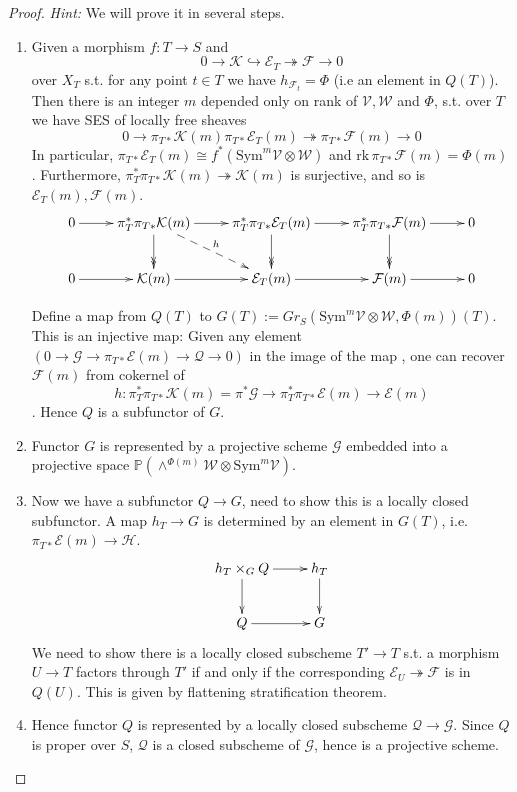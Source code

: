 \documentclass{article}
\begin{document}
\begin{proof}
	\emph{Hint:} We will prove it in several steps. 
	\begin{enumerate}
		\item Given a morphism $ f:T\to S $  and 
		$$ 0\to \mathcal{K}\hookrightarrow\mathcal{E}_T\twoheadrightarrow \mathcal{F}\to 0 $$
		over $ X_T $ s.t. for any point $ t\in T $  we have $ h_{\mathcal{F}_t}=\Phi $ (i.e an element in $ Q(T) $). Then  there is an integer $ m $ depended only on rank of $ \mathcal{V,W} $ and $ \Phi $, s.t. over $ T $ we have SES of locally free sheaves $$ 0\to\pi_{T*}\mathcal{K}(m)\pi_{T*}\mathcal{E}_T(m)\twoheadrightarrow\pi_{T*}\mathcal{F}(m)\to 0 $$
		In particular, $ \pi_{T*}\mathcal{E}_T(m)\cong f^*(\mathrm{Sym}^m\mathcal{V}\otimes \mathcal{W}) $ and $ \mathrm{rk}\,\pi_{T*}\mathcal{F}(m)=\Phi(m) $. Furthermore, $ \pi^*_T\pi_{T*}\mathcal{K}(m)\twoheadrightarrow \mathcal{K}(m) $ is surjective, and so is $ \mathcal{E}_T(m), \mathcal{F}(m) $. 
		$$ \xymatrix{
		0\ar[r]&\pi^*_T\pi_{T*}\mathcal{K}(m)\ar[r]\ar@{->>}[d]\ar@{-->}[dr]^h&\pi^*_T\pi_{T*}\mathcal{E}_T(m)\ar[r]\ar@{->>}[d]&\pi^*_T\pi_{T*}\mathcal{F}(m)\ar[r]\ar@{->>}[d]&0\\
		0\ar[r]&\mathcal{K}(m)\ar[r]&\mathcal{E}_T(m)\ar[r]&\mathcal{F}(m)\ar[r]&0
		} $$
	
		Define a map from $ Q(T) $ to $ G(T):=Gr_S(\mathrm{Sym}^m\mathcal{V}\otimes \mathcal{W},\Phi(m))(T) $. This is an injective map: Given any element $ (0\to\mathcal{G}\to \pi_{T*}\mathcal{E}(m)\to \mathcal{Q}\to 0 )$ in the image of the map , one can recover $ \mathcal{F}(m) $ from cokernel of $$ h:\pi_T^*\pi_{T*}\mathcal{K}(m)=\pi^*\mathcal{G}\to \pi_T^*\pi_{T*}\mathcal{E}(m)\to\mathcal{E}(m) $$. 
		Hence $ Q $ is a subfunctor of $ G $.
		
		\item Functor $ G $ is represented by a projective scheme $ \mathcal{G} $ embedded into a projective space $ \mathbb{P}(\wedge^{\Phi(m)}\mathcal{W}\otimes \mathrm{Sym}^m\mathcal{V}) $.
		
		
		\item   Now we have a subfunctor $ Q\to G $, need to show this is a locally closed subfunctor. A map $ h_T\to G $ is determined by an element in $ G(T) $, i.e. $   \pi_{T*}\mathcal{E}(m)\to \mathcal{H}  $.
		$$ \xymatrix{
			h_T\times_{G}Q\ar[r]\ar[d]&h_T\ar[d]\\
			Q\ar[r]&G
		} $$
		We need to show there is a locally closed subscheme $ T'\to T $ s.t. a morphism $ U\to T $ factors through $ T' $ if and only if the corresponding $ \mathcal{E}_U\twoheadrightarrow\mathcal{F} $ is in $ Q(U) $. This is given by flattening stratification theorem.
		\item Hence functor $ Q $ is represented by a locally closed subscheme $ \mathcal{Q}\to \mathcal{G} $. Since $ Q $ is proper over $ S $, $ \mathcal{Q} $ is a closed subscheme of $ \mathcal{G} $, hence is a projective scheme. 
	\end{enumerate}
\end{proof}
\end{document}
